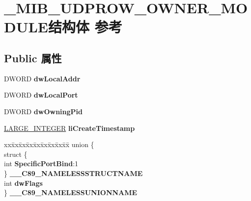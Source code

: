 \hypertarget{struct___m_i_b___u_d_p_r_o_w___o_w_n_e_r___m_o_d_u_l_e}{}\section{\+\_\+\+M\+I\+B\+\_\+\+U\+D\+P\+R\+O\+W\+\_\+\+O\+W\+N\+E\+R\+\_\+\+M\+O\+D\+U\+L\+E结构体 参考}
\label{struct___m_i_b___u_d_p_r_o_w___o_w_n_e_r___m_o_d_u_l_e}
\subsection*{Public 属性}
\begin{DoxyCompactItemize}
\item 
\mbox{\label{struct___m_i_b___u_d_p_r_o_w___o_w_n_e_r___m_o_d_u_l_e_a22b45ef4851be7e7140144d870ebcc50}} 
D\+W\+O\+RD {\bfseries dw\+Local\+Addr}
\item 
\mbox{\label{struct___m_i_b___u_d_p_r_o_w___o_w_n_e_r___m_o_d_u_l_e_a38eb1b082737c6cc4eeb18c747c47507}} 
D\+W\+O\+RD {\bfseries dw\+Local\+Port}
\item 
\mbox{\label{struct___m_i_b___u_d_p_r_o_w___o_w_n_e_r___m_o_d_u_l_e_a457a686470ed696b823b58e864c09837}} 
D\+W\+O\+RD {\bfseries dw\+Owning\+Pid}
\item 
\mbox{\label{struct___m_i_b___u_d_p_r_o_w___o_w_n_e_r___m_o_d_u_l_e_a124071c4ee82c7acbedd10f837dcdc6b}} 
\hyperlink{union___l_a_r_g_e___i_n_t_e_g_e_r}{L\+A\+R\+G\+E\+\_\+\+I\+N\+T\+E\+G\+ER} {\bfseries li\+Create\+Timestamp}
\item 
\mbox{\label{struct___m_i_b___u_d_p_r_o_w___o_w_n_e_r___m_o_d_u_l_e_a09a14ac3430a54d40243069b74309a52}} 
\begin{tabbing}
xx\=xx\=xx\=xx\=xx\=xx\=xx\=xx\=xx\=\kill
union \{\\
\>struct \{\\
\>\>int {\bfseries SpecificPortBind}:1\\
\>\} {\bfseries \_\_C89\_NAMELESSSTRUCTNAME}\\
\>int {\bfseries dwFlags}\\
\} {\bfseries \_\_C89\_NAMELESSUNIONNAME}\\


\end{tabbing}
\end{DoxyCompactItemize}
